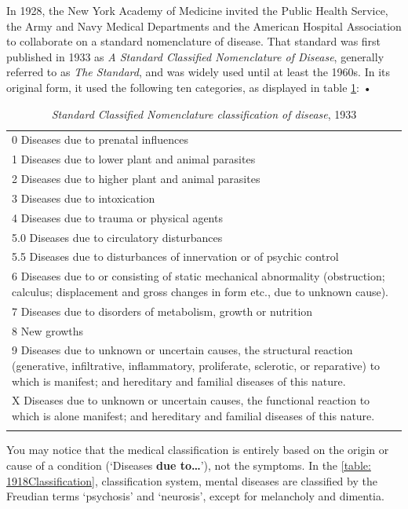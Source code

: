In 1928, the New York Academy of Medicine invited the Public Health Service, the Army and Navy Medical Departments and the American Hospital Association to collaborate on a standard nomenclature of disease. That standard was first published in 1933 as \emph{A Standard Classified Nomenclature of Disease}, generally referred to as \emph{The Standard}, and was widely used until at least the 1960s. In its original form, it used the following ten categories, as displayed in table \ref{table: 1933Classification}:
 •  \begin{longtable}[!t]{ | p{13.8cm} | }
\hline
0 Diseases due to prenatal influences\\
1 Diseases due to lower plant and animal parasites\\
2 Diseases due to higher plant and animal parasites\\
3 Diseases due to intoxication\\
4 Diseases due to trauma or physical agents\\
5.0 Diseases due to circulatory disturbances\\
5.5 Diseases due to disturbances of innervation or of psychic control\\
6 Diseases due to or consisting of static mechanical abnormality (obstruction; calculus; displacement and gross changes in form etc., due to unknown cause).\\
7 Diseases due to disorders of metabolism, growth or nutrition\\
8 New growths\\
9 Diseases due to unknown or uncertain causes, the structural reaction (generative, infiltrative, inflammatory, proliferate, sclerotic, or reparative) to which is manifest; and hereditary and familial diseases of this nature.\\
X Diseases due to unknown or uncertain causes, the functional reaction to which is alone manifest; and hereditary and familial diseases of this nature.\\ \hline
\caption{\emph{Standard Classified Nomenclature classification of disease}, 1933}
\label{table: 1933Classification}
\end{longtable}


You may notice that the medical classification is entirely based on the origin or cause of a condition (`Diseases \textbf{due to{\ldots}}'), not the symptoms. In the \ref{table: 1918Classification}, classification system, mental diseases are classified by the Freudian terms `psychosis' and `neurosis', except for melancholy and dimentia.


